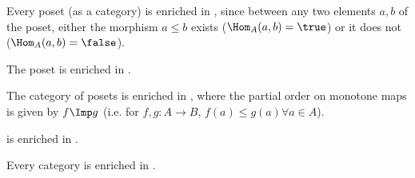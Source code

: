 \begin{example}
  \label{ex:enrichbool}Every poset (as a category) is enriched in \Bool, since between any two elements $a,b$ of the poset, either the morphism $a \leq b$ exists ($\Hom_A(a,b) = \true$) or it does not ($\Hom_A(a,b) = \false$).
\end{example}

\begin{example}
  The poset \Bool is enriched in \Bool.
\end{example}

\begin{example}
  The category \Pos of posets is enriched in \Pos, where the partial order on monotone maps is given by $f \Imp g$ (i.e. for $f,g : A \to B$, $f(a) \leq g(a) \forall a \in A$).
\end{example}

%

\begin{example}
  \Category is enriched in \Category.
\end{example}

\begin{example}
  Every category is enriched in \Set.
\end{example}


